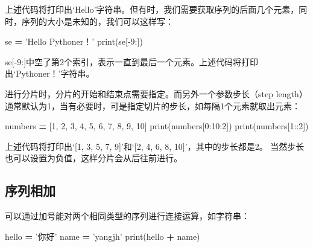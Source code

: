 \documentclass[]{ctexbook}
\newenvironment{Shaded}{\begin{snugshade}}{\end{snugshade}}
\newcommand{\BuiltInTok}[1]{#1}
\newcommand{\DecValTok}[1]{\textcolor[rgb]{0.00,0.00,0.81}{#1}}
\newcommand{\NormalTok}[1]{#1}
\newcommand{\OperatorTok}[1]{\textcolor[rgb]{0.81,0.36,0.00}{\textbf{#1}}}
\newcommand{\StringTok}[1]{\textcolor[rgb]{0.31,0.60,0.02}{#1}}
\begin{document}
上述代码将打印出`Hello'字符串。但有时，我们需要获取序列的后面几个元素，同时，序列的大小是未知的，我们可以这样写：

\begin{Shaded}
\begin{Highlighting}[]
\NormalTok{se }\OperatorTok{=} \StringTok{'Hello Pythoner！'}
\StringTok{print(se[-9:])}
\end{Highlighting}
\end{Shaded}

se{[}-9:{]}中空了第2个索引，表示一直到最后一个元素。上述代码将打印出`Pythoner！'字符串。

进行分片时，分片的开始和结束点需要指定。而另外一个参数步长（step length）通常默认为1，当有必要时，可是指定切片的步长，如每隔1个元素就取出元素：

\begin{Shaded}
\begin{Highlighting}[]
\NormalTok{numbers }\OperatorTok{=}\NormalTok{ [}\DecValTok{1}\NormalTok{, }\DecValTok{2}\NormalTok{, }\DecValTok{3}\NormalTok{, }\DecValTok{4}\NormalTok{, }\DecValTok{5}\NormalTok{, }\DecValTok{6}\NormalTok{, }\DecValTok{7}\NormalTok{, }\DecValTok{8}\NormalTok{, }\DecValTok{9}\NormalTok{, }\DecValTok{10}\NormalTok{]}
\BuiltInTok{print}\NormalTok{(numbers[}\DecValTok{0}\NormalTok{:}\DecValTok{10}\NormalTok{:}\DecValTok{2}\NormalTok{])}
\BuiltInTok{print}\NormalTok{(numbers[}\DecValTok{1}\NormalTok{::}\DecValTok{2}\NormalTok{])}
\end{Highlighting}
\end{Shaded}

上述代码将打印出`{[}1, 3, 5, 7, 9{]}'和`{[}2, 4, 6, 8, 10{]}'，其中的步长都是2。
当然步长也可以设置为负值，这样分片会从后往前进行。

\hypertarget{ux5e8fux5217ux76f8ux52a0}{%
\subsection{序列相加}\label{ux5e8fux5217ux76f8ux52a0}}

可以通过加号能对两个相同类型的序列进行连接运算，如字符串：

\begin{Shaded}
\begin{Highlighting}[]
\NormalTok{hello }\OperatorTok{=} \StringTok{'你好'}
\NormalTok{name }\OperatorTok{=} \StringTok{'yangjh'}
\BuiltInTok{print}\NormalTok{(hello }\OperatorTok{+}\NormalTok{ name)}
\end{Highlighting}
\end{Shaded}
\end{document}

